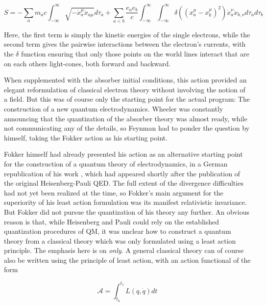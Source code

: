\documentclass[12pt,a4paper]{article}
\begin{document}
\begin{equation}
\label{eq:fokker}
S = - \sum_a m_a c \int_{-\infty}^{\infty} \sqrt{- \dot{x}_a^{\mu} \dot{x}_{a \mu}} d \tau_a + \sum_{a < b} \frac{e_a e_b}{c} \int_{-\infty}^{\infty} \int_{-\infty}^{\infty} \delta \left( \left( x_a^{\mu} - x_b^{\mu} \right)^2 \right) \dot{x}_a^{\nu} \dot{x}_{b,\nu} d \tau_a d \tau_b
\end{equation}

Here, the first term is simply the kinetic energies of the single electrons, while the second term gives the pairwise interactions between the electron's currents, with the $\delta$ function ensuring that only those points on the world lines interact that are on each others light-cones, both forward and backward.

When supplemented with the absorber initial conditions, this action provided an elegant reformulation of classical electron theory without involving the notion of a field. But this was of course only the starting point for the actual program: The construction of a new quantum electrodynamics. Wheeler was constantly announcing that the quantization of the absorber theory was almost ready, while not communicating any of the details, so Feynman had to ponder the question by himself, taking the Fokker action as his starting point.

Fokker himself had already presented his action as an alternative starting point for the construction of a quantum theory of electrodynamics, in a German republication of his work \citep{fokker_1929_ein-invarianter}, which had appeared shortly after the publication of the original Heisenberg-Pauli QED. The full extent of the divergence difficulties had not yet been realized at the time, so Fokker's main argument for the superiority of his least action formulation was its manifest relativistic invariance. But Fokker did not pursue the quantization of his theory any further. An obvious reason is that, while Heisenberg and Pauli could rely on the established quantization procedures of QM, it was unclear how to construct a quantum theory from a classical theory which was only formulated using a least action principle. The emphasis here is on \emph{only}. A general classical theory can of course also be written using the principle of least action, with an action functional of the form

\begin{equation}
\label{eq:action}
\mathcal{A} = \int_{t_0}^{t_1} L (q,\dot{q} ) dt
\end{equation}
\end{document}
